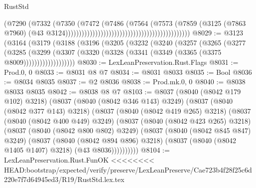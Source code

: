 \begin{lexlean}{RustStd}
\begin{coremodule}
{\begin{coremodule}
{{{{{{{{{{{{{{{{{{{{{{{{{{{{{{{{{{{{{{{{{{{{{                                                                            (@7290
                                                                              (@7332
                                                                                (@7350
                                                                                  (@7472
                                                                                    (@7486
                                                                                      (@7564
                                                                                        (@7573
                                                                                          (@7859
                                                                                            (@3125
                                                                                              (@7863
                                                                                                @7960)
                                                                                              (@43
                                                                                                @3124))))))))))))))))))))))))))))))))))))))))))))))
@8029 := @3123
    (@3164
      (@3179
        (@3188
          (@3196
            (@3205
              (@3232
                (@3240
                  (@3257
                    (@3265
                      (@3277
                        (@3285
                          (@3299
                            (@3307
                              (@3320 (@3328 (@3341 (@3349 (@3365 (@3375 @8009)))))))))))))))))))
@8030 := LexLeanPreservation.Rust.Flags
@8031 := Prod.{0, 0}
@8033 := @8031 @8 @7
@8034 := @8031 @8033
@8035 := Bool
@8036 := @8034 @8035
@8037 := @2 @8036
@8038 := Prod.mk.{0, 0}
@8040 := @8038 @8033 @8035
@8042 := @8038 @8 @7
@8103 := @8037
    (@8040 (@8042 @179 @102) @3218)
    (@8037
      (@8040 (@8042 @346 @143) @3249)
      (@8037
        (@8040 (@8042 @377 @143) @3218)
        (@8037
          (@8040 (@8042 @419 @265) @3218)
          (@8037
            (@8040 (@8042 @400 @449) @3249)
            (@8037
              (@8040 (@8042 @423 @265) @3218)
              (@8037
                (@8040 (@8042 @800 @802) @3249)
                (@8037
                  (@8040 (@8042 @845 @847) @3249)
                  (@8037
                    (@8040 (@8042 @894 @896) @3218)
                    (@8037 (@8040 (@8042 @1405 @1407) @3218) (@43 @8036))))))))))
@8104 := LexLeanPreservation.Rust.FunOK
<<<<<<<< HEAD:bootstrap/expected/verify/preserve/LexLeanPreserve/Cae723b4f28f25c6d220e7f7d64945ed3/R19/RustStd.lex.tex
}}}}}}}}}}}}}}}}}}}}}}}}}}}}}}}}}}}}}}}}}}}}}
\end{coremodule}}
\end{coremodule}
\end{lexlean}
